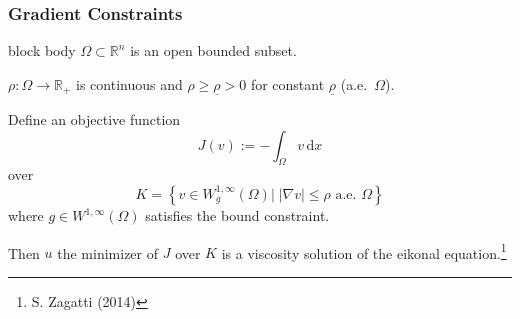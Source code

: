 \documentclass[aspectratio=169,xcolor=dvipsnames,11pt]{beamer}
\begin{document}
\begin{frame}\frametitle{Gradient Constraints}
\begin{beamercolorbox}[rounded=true, shadow=true, wd=\textwidth]{block body}
$\Omega \subset \mathbb R^n$ is an open bounded subset.\medskip

$\rho : \Omega \to \mathbb R_+$ is continuous and $\rho \ge \underline{\rho} > 
0$ for constant $\underline{\rho}$ (a.e.\ $\Omega$).\medskip

Define an objective function
\[
J(v) := -\int_{\Omega} v \, \mathrm{d} x 
\] 
over
\[
K = \left\{
v \in W^{1,\infty}_g(\Omega) \left|\; | \nabla v | \le \rho \text{ a.e. } \Omega \right.
\right\}
\] 
where $g \in W^{1,\infty}(\Omega)$ satisfies the bound constraint.\medskip

Then $u$ the \alert{minimizer} of $J$ over $K$ is a \alert{viscosity solution} of the \alert{eikonal equation}.\footnote{\tiny S. Zagatti (2014)}
\end{beamercolorbox}

\end{frame}
\end{document}
